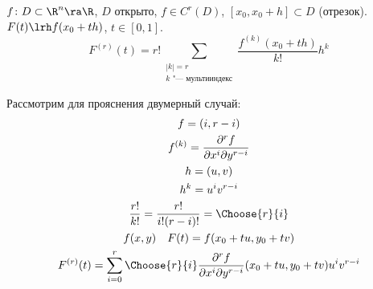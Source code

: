 \begin{lemma}
	$f\colon D \subset \R^n \ra \R$, $D$ открыто, $f \in C^r(D)$, $[x_0, x_0 + h] \subset D$ (отрезок).
	$F(t) \lrh f(x_0 + th)$, $t \in [0,1]$.
	\[ F^{(r)}(t) = r! \sum_{\substack{|k| = r \\ \text{$k$ "--- мультииндекс}}} \frac{f^{(k)}(x_0 + th)}{k!} h^k \]
\end{lemma}
\begin{Rem}
	Рассмотрим для прояснения двумерный случай:
	\begin{gather*}
		f = (i, r - i) \\
		f^{(k)} = \frac{\partial^r f}{\partial x^i \partial y^{r-i}} \\
		h = (u, v) \\
		h^k = u^i v^{r-i} \\
		\frac{r!}{k!} = \frac{r!}{i! (r-i)!} = \Choose{r}{i} \\
		f(x, y) \quad F(t) = f(x_0 + tu, y_0 + tv) \\
		F^{(r)} (t) = \sum_{i = 0}^r \Choose{r}{i} \frac{\partial^r f}{\partial x^i \partial y^{r-i}} (x_0 + tu, y_0 + tv) u^i v^{r-i}
	\end{gather*}
\end{Rem}
